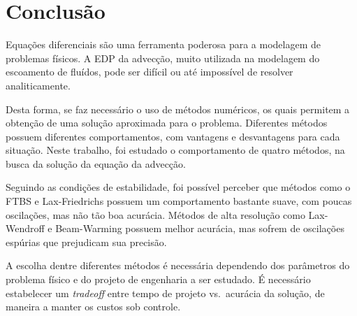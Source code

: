 \chapter{Conclusão}
Equações diferenciais são uma ferramenta poderosa para a modelagem de problemas
físicos. A EDP da advecção, muito utilizada na modelagem do escoamento de
fluídos, pode ser difícil ou até impossível de resolver analiticamente.

Desta forma, se faz necessário o uso de métodos numéricos, os quais permitem a
obtenção de uma solução aproximada para o problema. Diferentes métodos possuem
diferentes comportamentos, com vantagens e desvantagens para cada situação.
Neste trabalho, foi estudado o comportamento de quatro métodos, na busca da
solução da equação da advecção.

Seguindo as condições de estabilidade, foi possível perceber que métodos como o
FTBS e Lax-Friedrichs possuem um comportamento bastante suave, com poucas
oscilações, mas não tão boa acurácia. Métodos de alta resolução como
Lax-Wendroff e Beam-Warming possuem melhor acurácia, mas sofrem de oscilações
espúrias que prejudicam sua precisão.

A escolha dentre diferentes métodos é necessária dependendo dos parâmetros do
problema físico e do projeto de engenharia a ser estudado. É necessário
estabelecer um \textit{tradeoff} entre tempo de projeto vs.\ acurácia da
solução, de maneira a manter os custos sob controle.